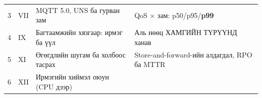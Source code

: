 \begin{longtable}[]{@{}llll@{}}
\begin{minipage}[t]{0.22\columnwidth}\raggedright
3\strut
\end{minipage} & \begin{minipage}[t]{0.22\columnwidth}\raggedright
VII\strut
\end{minipage} & \begin{minipage}[t]{0.22\columnwidth}\raggedright
MQTT 5.0, UNS ба гурван зам\strut
\end{minipage} & \begin{minipage}[t]{0.22\columnwidth}\raggedright
QoS × зам: p50/p95/\textbf{p99}\strut
\end{minipage}\tabularnewline
\begin{minipage}[t]{0.22\columnwidth}\raggedright
4\strut
\end{minipage} & \begin{minipage}[t]{0.22\columnwidth}\raggedright
IX\strut
\end{minipage} & \begin{minipage}[t]{0.22\columnwidth}\raggedright
Багтаамжийн хязгаар: ирмэг ба үүл\strut
\end{minipage} & \begin{minipage}[t]{0.22\columnwidth}\raggedright
Аль нөөц ХАМГИЙН ТҮРҮҮНД ханав\strut
\end{minipage}\tabularnewline
\begin{minipage}[t]{0.22\columnwidth}\raggedright
5\strut
\end{minipage} & \begin{minipage}[t]{0.22\columnwidth}\raggedright
XI\strut
\end{minipage} & \begin{minipage}[t]{0.22\columnwidth}\raggedright
Өгөгдлийн шугам ба холбоос тасрах\strut
\end{minipage} & \begin{minipage}[t]{0.22\columnwidth}\raggedright
Store-and-forward-ийн алдагдал, RPO ба MTTR\strut
\end{minipage}\tabularnewline
\begin{minipage}[t]{0.22\columnwidth}\raggedright
6\strut
\end{minipage} & \begin{minipage}[t]{0.22\columnwidth}\raggedright
XII\strut
\end{minipage} & \begin{minipage}[t]{0.22\columnwidth}\raggedright
Ирмэгийн хиймэл оюун (CPU дээр)\strut
\end{minipage} & \begin{minipage}[t]{0.22\columnwidth}\raggedright

\end{minipage}
\end{longtable}
